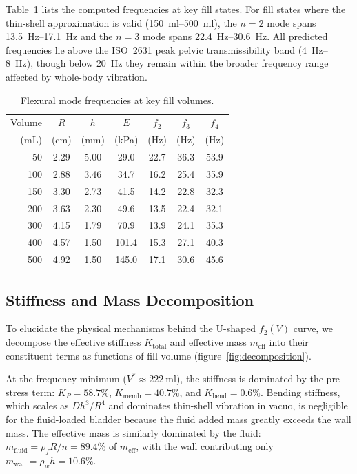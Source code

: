Table~\ref{tab:frequencies} lists the computed frequencies at key fill states.
For fill states where the thin-shell approximation is valid
(\SIrange{150}{500}{\milli\litre}), the $n = 2$ mode spans
\SIrange{13.5}{17.1}{\hertz} and the $n = 3$ mode spans
\SIrange{22.4}{30.6}{\hertz}.  All predicted
frequencies lie above the ISO~2631 peak pelvic transmissibility band
(\SIrange{4}{8}{\hertz}), though below \SI{20}{\hertz} they remain within
the broader frequency range affected by whole-body vibration.

\begin{table}[htbp]
  \centering
  \caption{Flexural mode frequencies at key fill volumes.}
  \label{tab:frequencies}
  \begin{tabular}{rcccccc}
    \toprule
    Volume & $R$ & $h$ & $E$ & $f_2$ & $f_3$ & $f_4$ \\
    (mL) & (cm) & (mm) & (kPa) & (Hz) & (Hz) & (Hz) \\
    \midrule
     50 & 2.29 & 5.00 &  29.0 & 22.7 & 36.3 & 53.9 \\
    100 & 2.88 & 3.46 &  34.7 & 16.2 & 25.4 & 35.9 \\
    150 & 3.30 & 2.73 &  41.5 & 14.2 & 22.8 & 32.3 \\
    200 & 3.63 & 2.30 &  49.6 & 13.5 & 22.4 & 32.1 \\
    300 & 4.15 & 1.79 &  70.9 & 13.9 & 24.1 & 35.3 \\
    400 & 4.57 & 1.50 & 101.4 & 15.3 & 27.1 & 40.3 \\
    500 & 4.92 & 1.50 & 145.0 & 17.1 & 30.6 & 45.6 \\
    \bottomrule
  \end{tabular}
\end{table}


\subsection{Stiffness and Mass Decomposition}
\label{sec:decomposition}

To elucidate the physical mechanisms behind the U-shaped $f_2(V)$ curve, we
decompose the effective stiffness $K_\mathrm{total}$ and effective mass
$m_\mathrm{eff}$ into their constituent terms as functions of fill volume
(figure~\ref{fig:decomposition}).

At the frequency minimum ($V^* \approx \SI{222}{\milli\litre}$), the
stiffness is dominated by the pre-stress term:
$K_P = 58.7\%$, $K_\mathrm{memb} = 40.7\%$, and
$K_\mathrm{bend} = 0.6\%$.  Bending stiffness, which scales as $Dh^3/R^4$
and dominates thin-shell vibration in vacuo, is negligible for the
fluid-loaded bladder because the fluid added mass greatly exceeds the wall
mass.  The effective mass is similarly dominated by the fluid:
$m_\mathrm{fluid} = \rho_f R / n = 89.4\%$ of $m_\mathrm{eff}$, with the
wall contributing only $m_\mathrm{wall} = \rho_w h = 10.6\%$.

